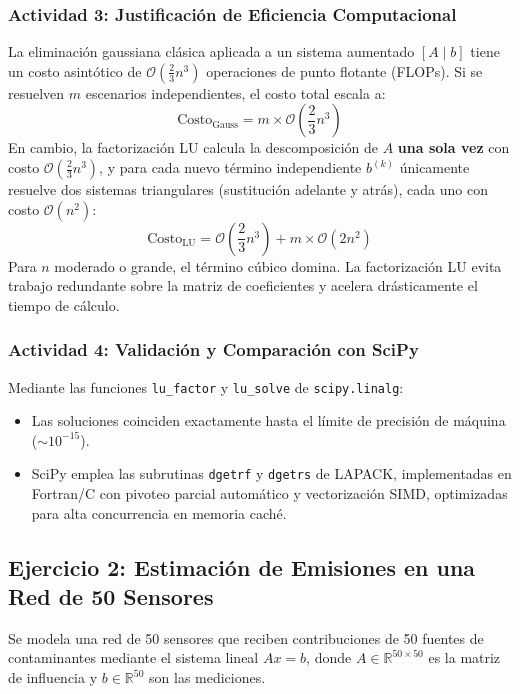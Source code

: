 \documentclass[11pt,a4paper]{article}
\theoremstyle{definition}
\theoremstyle{remark}
\begin{document}
\subsubsection{Actividad 3: Justificación de Eficiencia Computacional}
La eliminación gaussiana clásica aplicada a un sistema aumentado $[A \mid b]$ tiene un costo asintótico de $\mathcal{O}\left(\frac{2}{3}n^3\right)$ operaciones de punto flotante (FLOPs). Si se resuelven $m$ escenarios independientes, el costo total escala a:
\begin{equation}
    \text{Costo}_{\text{Gauss}} = m \times \mathcal{O}\left(\frac{2}{3}n^3\right)
\end{equation}
En cambio, la factorización LU calcula la descomposición de $A$ \textbf{una sola vez} con costo $\mathcal{O}\left(\frac{2}{3}n^3\right)$, y para cada nuevo término independiente $b^{(k)}$ únicamente resuelve dos sistemas triangulares (sustitución adelante y atrás), cada uno con costo $\mathcal{O}(n^2)$:
\begin{equation}
    \text{Costo}_{\text{LU}} = \mathcal{O}\left(\frac{2}{3}n^3\right) + m \times \mathcal{O}(2n^2)
\end{equation}
Para $n$ moderado o grande, el término cúbico domina. La factorización LU evita trabajo redundante sobre la matriz de coeficientes y acelera drásticamente el tiempo de cálculo.

\subsubsection{Actividad 4: Validación y Comparación con SciPy}
Mediante las funciones \texttt{lu\_factor} y \texttt{lu\_solve} de \texttt{scipy.linalg}:
\begin{itemize}[leftmargin=*]
    \item Las soluciones coinciden exactamente hasta el límite de precisión de máquina ($\sim 10^{-15}$).
    \item SciPy emplea las subrutinas \texttt{dgetrf} y \texttt{dgetrs} de LAPACK, implementadas en Fortran/C con pivoteo parcial automático y vectorización SIMD, optimizadas para alta concurrencia en memoria caché.
\end{itemize}

\subsection{Ejercicio 2: Estimación de Emisiones en una Red de 50 Sensores}
Se modela una red de 50 sensores que reciben contribuciones de 50 fuentes de contaminantes mediante el sistema lineal $Ax = b$, donde $A \in \mathbb{R}^{50 \times 50}$ es la matriz de influencia y $b \in \mathbb{R}^{50}$ son las mediciones.
\end{document}
